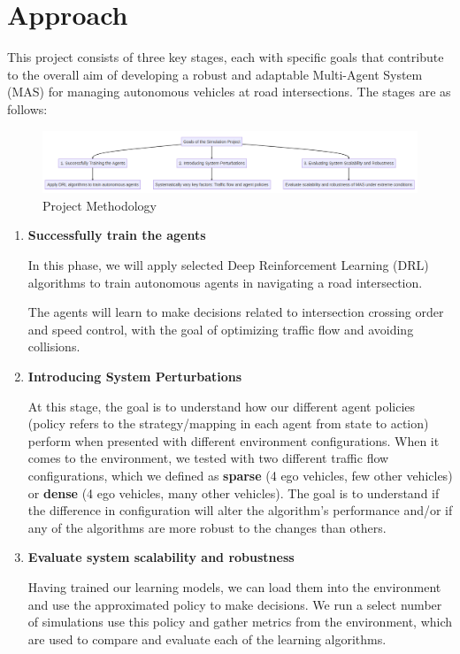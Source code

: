 \section{Approach}

This project consists of three key stages, each with specific goals that contribute to the overall aim of developing a robust and adaptable Multi-Agent System (MAS) for managing autonomous vehicles at road intersections. 
The stages are as follows:

\begin{figure}[H]
    \centering
    \includegraphics[height=0.12\textheight]{images/goals.png} 
    \caption{Project Methodology}
\end{figure}

\begin{enumerate}
    \item \textbf{Successfully train the agents}

       In this phase, we will apply selected Deep Reinforcement Learning (DRL) algorithms to train autonomous agents in navigating a road intersection.
       
       The agents will learn to make decisions related to intersection crossing order and speed control, with the goal of optimizing traffic flow and avoiding collisions.
           
    \item \textbf{Introducing System Perturbations}
    
   At this stage, the goal is to understand how our different agent policies (policy refers to the strategy/mapping in each agent from state to action) perform when presented with different environment configurations. When it comes to the environment, we tested with two different traffic flow configurations, 
   which we defined as \textbf{sparse} (4 ego vehicles, few other vehicles) or \textbf{dense} (4 ego vehicles, many other vehicles). 
   The goal is to understand if the difference in configuration will alter the algorithm's performance and/or if any of the algorithms are more robust to the changes than others.
       

       
    \item \textbf{Evaluate system scalability and robustness}

    Having trained our learning models, we can load them into the environment and use the approximated policy to make decisions. 
    We run a select number of simulations use this policy and gather metrics from the environment, 
    which are used to compare and evaluate each of the learning algorithms.
\end{enumerate}


